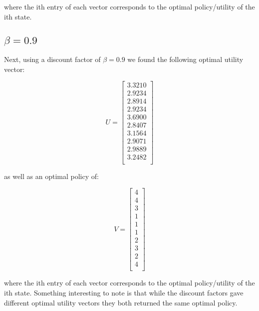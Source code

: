 \documentclass{article}
\begin{document}
	where the ith entry of each vector corresponds to the optimal policy/utility of the ith state.
	
	\subsection{$\beta = 0.9$}
	
	Next, using a discount factor of $\beta = 0.9$ we found the following optimal utility vector:
	
	\begin{equation}
	U
	=
	\begin{bmatrix}
	3.3210\\
	2.9234\\
	2.8914\\
	2.9234\\
	3.6900\\
	2.8407\\
	3.1564\\
	2.9071\\
	2.9889\\
	3.2482\\
	\end{bmatrix}
	\end{equation}
	
	as well as an optimal policy of:
	
	\begin{equation}
	V
	=
	\begin{bmatrix}
	4\\
	4\\
	3\\
	1\\
	1\\
	1\\
	2\\
	3\\
	2\\
	4\\
	\end{bmatrix}
	\end{equation}
	
	where the ith entry of each vector corresponds to the optimal policy/utility of the ith state. Something interesting to note is that while the discount factors gave different optimal utility vectors they both returned the same optimal policy.
	
	
\end{document}
